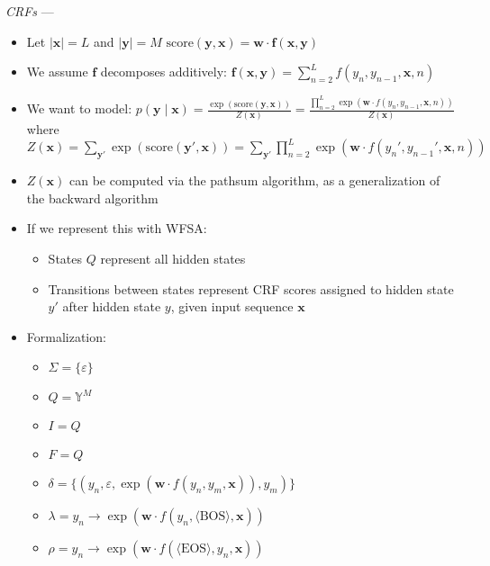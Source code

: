 \emph{CRFs} --- 
\begin{itemize}
    \item Let $|\boldsymbol{x}| = L$ and $|\boldsymbol{y}| = M$
    $
    \textrm{score}(\boldsymbol{y}, \boldsymbol{x}) = \boldsymbol{w} \cdot \boldsymbol{f}(\boldsymbol{x}, \boldsymbol{y})
    $
    \item We assume $\boldsymbol{f}$ decomposes additively:
    $
    \boldsymbol{f}(\boldsymbol{x}, \boldsymbol{y}) = \sum_{n=2}^L f(y_n, y_{n-1}, \boldsymbol{x}, n)
    $
    \item We want to model:
    $
    p(\boldsymbol{y} \mid \boldsymbol{x}) = \frac{\exp(\textrm{score}(\boldsymbol{y}, \boldsymbol{x}))}{Z(\boldsymbol{x})} = \frac{\prod_{n=2}^L \exp(\boldsymbol{w} \cdot f(y_n, y_{n-1}, \boldsymbol{x}, n))}{Z(\boldsymbol{x})}
    $
    where
    $
    Z(\boldsymbol{x}) = \sum_{\boldsymbol{y}'} \exp(\textrm{score}(\boldsymbol{y}', \boldsymbol{x})) = \sum_{\boldsymbol{y}'} \prod_{n=2}^L \exp(\boldsymbol{w} \cdot f(y_n', y_{n-1}', \boldsymbol{x}, n))
    $
    \item $Z(\boldsymbol{x})$ can be computed via the pathsum algorithm, as a generalization of the backward algorithm
    \item If we represent this with WFSA:
    \begin{itemize}
        \item States $Q$ represent all hidden states
        \item Transitions between states represent CRF scores assigned to hidden state $y'$ after hidden state $y$, given input sequence $\boldsymbol{x}$
    \end{itemize}
    \item Formalization:
    \begin{itemize}
        \item $\Sigma = \{\varepsilon\}$
        \item $Q = \mathbb{Y}^M$
        \item $I = Q$
        \item $F = Q$
        \item $\delta = \{(y_n, \varepsilon, \exp(\boldsymbol{w} \cdot f(y_n, y_{m}, \boldsymbol{x})), y_m) \}$
        \item $\lambda = y_n \to \exp(\boldsymbol{w} \cdot f(y_n, \langle \textrm{BOS} \rangle, \boldsymbol{x}))$
        \item $\rho = y_n \to \exp(\boldsymbol{w} \cdot f(\langle \textrm{EOS} \rangle, y_n, \boldsymbol{x}))$
    \end{itemize}
\end{itemize}

